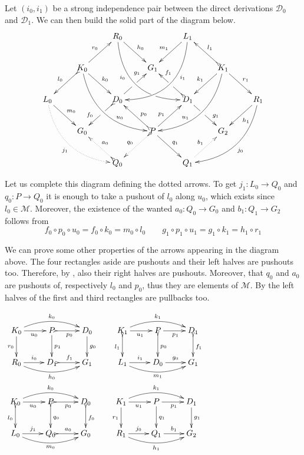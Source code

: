 \documentclass[a4paper,UKenglish,cleveref,pdftex, thm-restate,numberwithinsect,anonymous]{lipics}
\newcommand{\dder}[1]{\mathscr{#1}}
\begin{document}
\begin{remark}\label{rem:deco} 
	Let $(i_0, i_1)$ be a strong
	independence pair between the direct derivations $\dder{D}_0$ and
	$\dder{D}_1$. We can then build the solid part of the diagram
	below.
	\[\xymatrix{&&R_0 \ar@/_1cm/[ddrr]_(.35){i_0}|(.7)\hole
		\ar[dr]^{h_0}&& L_1\ar@/^1cm/[ddll]^(.35){i_1}
		\ar[dl]_{m_1}\\&K_0\ar[dr]^{k_0}\ar@{>->}[dl]_{l_0}
		\ar@/_.8cm/[ddrr]^(.65){u_0}\ar[ur]^{r_0}&& G_1 && K_1
		\ar@/^.8cm/[ddll]_(.65){u_1}\ar[dl]_{k_1}\ar@{>->}[lu]_{l_1}
		\ar[dr]^{r_1}\\L_0 \ar[dr]^{m_0}
		\ar@{.>}@/_.8cm/[ddrr]_{j_1}&& D_0
		\ar@{>->}[dl]|(.42)\hole_(.64){f_0}\ar[ur]|(.48)\hole^(.7){g_1}&&D_1
		\ar[dr]|(.42)\hole^(.65){g_1}
		\ar@{>->}[ul]|(.48)\hole_(.7){f_1}&&R_1\ar@/^.8cm/[ddll]^{j_0}\ar[dl]^{h_1}\\&G_0
		&&P\ar[dr]^{q_1}
		\ar@{>.>}[dl]_{q_0}\ar[ur]^(.4){p_1}\ar@{>->}[ul]_(.4){p_0}&&G_2\\&&Q_0
		\ar@{>->}@{>.>}[ul]_{a_0} &&Q_1\ar@{.>}[ur]^{b_1}}
	\]
	
	Let us complete this diagram defining the dotted arrows. To get
	$j_1\colon L_0\to Q_0$ and $q_0\colon P\to Q_0$ it is enough to
	take a pushout of $l_0$ along $u_0$, which exists since
	$l_0\in \mathcal{M}$. Moreover, the existence of the wanted
	$a_0\colon Q_0\to G_0$ and $b_1\colon Q_1\to G_2$ follows from
	\[
	f_0\circ p_0 \circ u_0 = f_0\circ k_0 = m_0\circ l_0 \qquad
	g_1\circ p_1\circ u_1 = g_1\circ k_1=h_1\circ r_1
	\]
	
	\noindent
	\parbox{5.5cm}{\hspace{15pt}We can prove some other properties of
		the arrows appearing in the diagram above. The four rectangles
		aside are pushouts and their left halves are pushouts
		too. Therefore, by , also their right halves are
		pushouts.  Moreover, that $q_0$ and $a_0$ are pushouts of,
		respectively $l_0$ and $p_0$, thus they are elements of
		$\mathcal{M}$. By  the left halves of the
		first and third rectangles are pullbacks too.}  \parbox{3.5cm}{
		$\xymatrix{K_0 \ar@/^.4cm/[rr]^{k_0}\ar[d]_{r_0}\ar[r]_{u_0}
			&P\ar[d]^{p_1} \ar@{>->}[r]_{p_0} & D_0 \ar[d]^{g_0}&K_1
			\ar@/^.4cm/[rr]^{k_1}\ar@{>->}[d]_{l_1}\ar[r]_{u_1}
			&P\ar@{>->}[d]^{p_0} \ar[r]_{p_1} & D_1 \ar@{>->}[d]^{f_1}\\
			R_0 \ar@/_.4cm/[rr]_{h_0} \ar[r]^{i_0}&D_1 \ar@{>->}[r]^{f_1}
			& G_1&L_1 \ar@/_.4cm/[rr]_{m_1} \ar[r]^{i_1}&D_0\ar[r]^{g_0} &
			G_1}$
		$\xymatrix{K_0
			\ar@/^.4cm/[rr]^{k_0}\ar@{>->}[d]_{l_0}\ar[r]_{u_0}
			&P\ar@{>->}[d]^{q_0} \ar@{>->}[r]_{p_0} & D_0
			\ar@{>->}[d]^{f_0}&K_1
			\ar@/^.4cm/[rr]^{k_1}\ar[d]_{r_1}\ar[r]_{u_1}
			&P\ar[d]^{q_1} \ar[r]_{p_1} & D_1 \ar[d]^{g_1}\\
			L_0 \ar@/_.4cm/[rr]_{m_0} \ar[r]^{j_1}&Q_0 \ar@{>->}[r]^{a_0}
			& G_0&R_1 \ar@/_.4cm/[rr]_{h_1} \ar[r]^{j_0}&Q_1 \ar[r]^{b_1}
			& G_2}$}
\end{remark}
\end{document}
